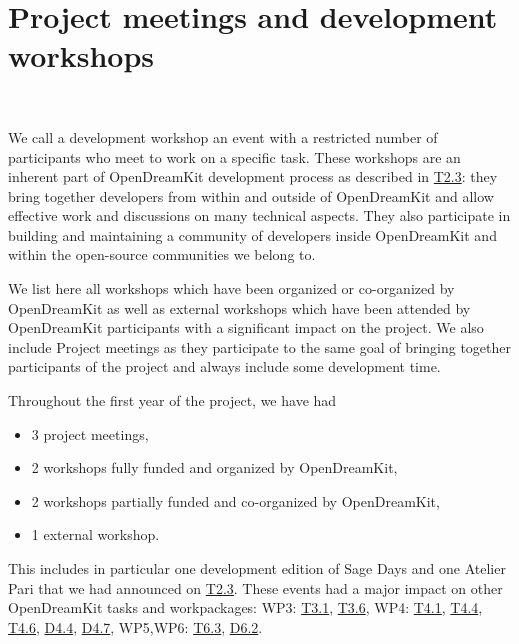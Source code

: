 \documentclass{deliverablereport}
\author{Viviane Pons}
\begin{document}
\maketitle
\githubissuedescription
\newpage
\tableofcontents
\newpage


\section{Project meetings and development workshops}
~

We call a development workshop an event with a restricted number of participants
who meet to work on a specific task. These workshops are an inherent part
of OpenDreamKit development process as described in \href{https://github.com/OpenDreamKit/OpenDreamKit/issues/26}{T2.3}:
 they bring together
developers from within and outside of OpenDreamKit and allow effective work
and discussions on many technical aspects. They also participate in building
and maintaining a community of developers inside OpenDreamKit and within the
open-source communities we belong to.

We list here all workshops which have been organized or co-organized by OpenDreamKit
as well as external workshops which have been attended by OpenDreamKit participants
with a significant impact on the project. We also include Project meetings as they
participate to the same goal of bringing together participants of the project and
always include some development time.

Throughout the first year of the project, we have had
\begin{itemize}
\item 3 project meetings,
\item 2 workshops fully funded and organized by OpenDreamKit,
\item 2 workshops partially funded and co-organized by OpenDreamKit,
\item 1 external workshop.
\end{itemize}
This includes in particular one development edition of Sage Days and one Atelier
Pari that we had announced on \href{https://github.com/OpenDreamKit/OpenDreamKit/issues/26}{T2.3}.
 These events had a major impact on other OpenDreamKit tasks and workpackages: WP3: 
\href{https://github.com/OpenDreamKit/OpenDreamKit/issues/50}{T3.1},
\href{https://github.com/OpenDreamKit/OpenDreamKit/issues/55}{T3.6},
WP4:
\href{https://github.com/OpenDreamKit/OpenDreamKit/issues/69}{T4.1},
\href{https://github.com/OpenDreamKit/OpenDreamKit/issues/72}{T4.4},
\href{https://github.com/OpenDreamKit/OpenDreamKit/issues/74}{T4.6},
\href{https://github.com/OpenDreamKit/OpenDreamKit/issues/93}{D4.4},
\href{https://github.com/OpenDreamKit/OpenDreamKit/issues/96}{D4.7},
WP5,WP6:
\href{https://github.com/OpenDreamKit/OpenDreamKit/issues/125}{T6.3},
\href{https://github.com/OpenDreamKit/OpenDreamKit/issues/136}{D6.2}.
\end{document}
